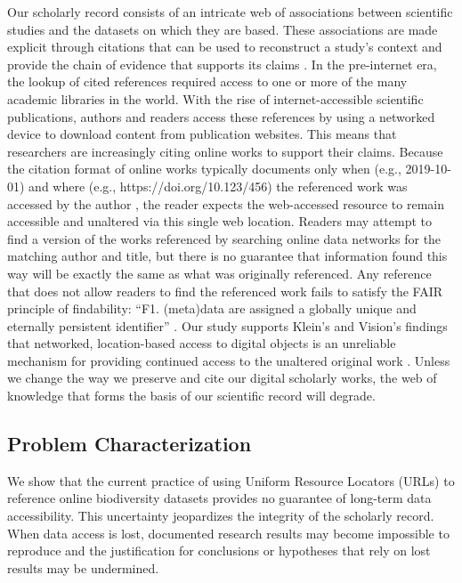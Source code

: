 Our scholarly record consists of an intricate web of associations between scientific studies and the datasets on which they are based. These associations are made explicit through citations that can be used to reconstruct a study's context and provide the chain of evidence that supports its claims \citep{Garfield_1964}. In the pre-internet era, the lookup of cited references required access to one or more of the many academic libraries in the world. With the rise of internet-accessible scientific publications, authors and readers access these references by using a networked device to download content from publication websites. This means that researchers are increasingly citing online works to support their claims. Because the citation format of online works typically documents only when (e.g., 2019-10-01) and where (e.g., https://doi.org/10.123/456) the referenced work was accessed by the author , the reader expects the web-accessed resource to remain accessible and unaltered via this single web location. Readers may attempt to find a version of the works referenced by searching online data networks for the matching author and title, but there is no guarantee that information found this way will be exactly the same as what was originally referenced. Any reference that does not allow readers to find the referenced work fails to satisfy the FAIR principle of findability: ``F1. (meta)data are assigned a globally unique and eternally persistent identifier'' \citep{Wilkinson_2016}. Our study supports Klein’s and Vision’s findings that networked, location-based access to digital objects is an unreliable mechanism for providing continued access to the unaltered original work \citep{Vision_2010,Klein_2014}. Unless we change the way we preserve and cite our digital scholarly works, the web of knowledge that forms the basis of our scientific record will degrade.

\subsection*{Problem Characterization}
We show that the current practice of using Uniform Resource Locators (URLs) \citep{rfc1738} to reference online biodiversity datasets provides no guarantee of long-term data accessibility. This uncertainty jeopardizes the integrity of the scholarly record. When data access is lost, documented research results may become impossible to reproduce and the justification for conclusions or hypotheses that rely on lost results may be undermined.

